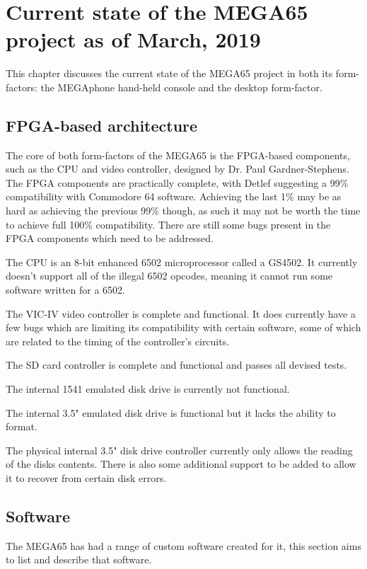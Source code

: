 
\chapter{Current state of the MEGA65 project as of March, 2019}
\label{cha: Chapter5}
This chapter discusses the current state of the MEGA65 project in both its form-factors: the MEGAphone hand-held console and the desktop form-factor. 
\section{FPGA-based architecture}
The core of both form-factors of the MEGA65 is the FPGA-based components, such as the CPU and video controller, designed by Dr. Paul Gardner-Stephens. The FPGA components are practically complete, with Detlef suggesting a 99\% compatibility with Commodore 64 software. Achieving the last 1\% may be as hard as achieving the previous 99\% though, as such it may not be worth the time to achieve full 100\% compatibility. There are still some bugs present in the FPGA components which need to be addressed.

The CPU is an 8-bit enhanced 6502 microprocessor called a GS4502. It currently doesn't support all of the illegal 6502 opcodes, meaning it cannot run some software written for a 6502.

The VIC-IV video controller is complete and functional. It does currently have a few bugs which are limiting its compatibility with certain software, some of which are related to the timing of the controller's circuits.

The SD card controller is complete and functional and passes all devised tests.

The internal 1541 emulated disk drive is currently not functional.

The internal 3.5" emulated disk drive is functional but it lacks the ability to format.

The physical internal 3.5" disk drive controller currently only allows the reading of the disks contents. There is also some additional support to be added to allow it to recover from certain disk errors.

\section{Software}
The MEGA65 has had a range of custom software created for it, this section aims to list and describe that software.

